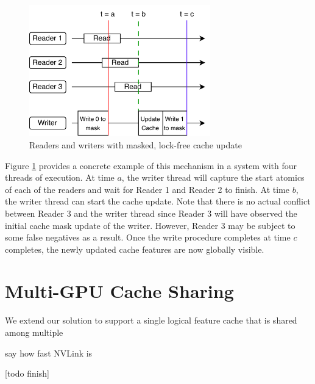 \begin{figure}[h!]
    \centering
    \includegraphics[width=0.7\textwidth]{diagrams/group_meeting_gnn-Multi-GPU.png}
    
    \caption{Readers and writers with masked, lock-free cache update}
    \label{Design: Lock-free update diagram}
\end{figure}    
Figure \ref{Design: Lock-free update diagram} provides a concrete example of this mechanism in a system with four threads of execution. At time $a$, the writer thread will capture the start atomics of each of the readers and wait for Reader 1 and Reader 2 to finish. At time $b$, the writer thread can start the cache update. Note that there is no actual conflict between Reader 3 and the writer thread since Reader 3 will have observed the initial cache mask update of the writer. However, Reader 3 may be subject to some false negatives as a result. Once the write procedure completes at time $c$ completes, the newly updated cache features are now globally visible.

\section{Multi-GPU Cache Sharing} \label{Design: Multi-GPU}
We extend our solution to support a single logical feature cache that is shared among multiple 

say how fast NVLink is

[todo finish]